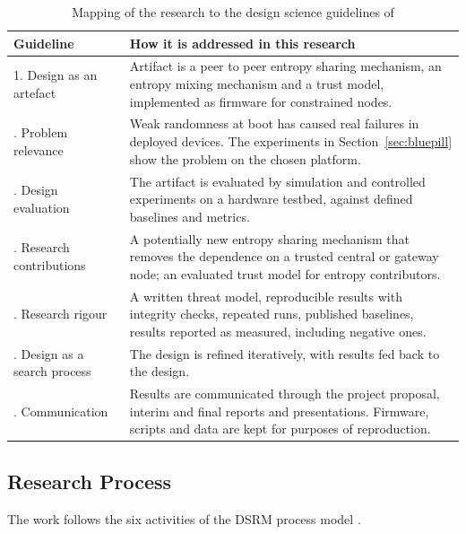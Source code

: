 \documentclass[a4paper, 12pt]{article}
\begin{document}
\begin{table}[htbp]
\centering
\small
\caption{Mapping of the research to the design science guidelines of \citet{hevner2004design}}
\label{tab:meth_hevner}
\begin{tabularx}{\textwidth}{@{}p{}X@{}}
\toprule
\textbf{Guideline} & \textbf{How it is addressed in this research} \\
\midrule
1. Design as an artefact & Artifact is a peer to peer entropy sharing mechanism, an entropy mixing mechanism and a trust model, implemented as firmware for constrained nodes. \\
\addlinespace
2. Problem relevance & Weak randomness at boot has caused real failures in deployed devices. The experiments in Section~\ref{sec:bluepill} show the problem on the chosen platform. \\
\addlinespace
3. Design evaluation & The artifact is evaluated by simulation and controlled experiments on a hardware testbed, against defined baselines and metrics.\\
\addlinespace
4. Research contributions & A potentially new entropy sharing mechanism that removes the dependence on a trusted central or gateway node; an evaluated trust model for entropy contributors.\\
\addlinespace
5. Research rigour & A written threat model, reproducible results with integrity checks, repeated runs, published baselines, results reported as measured, including negative ones. \\
\addlinespace
6. Design as a search process & The design is refined iteratively, with results fed back to the design.\\
\addlinespace
7. Communication & Results are communicated through the project proposal, interim and final reports and presentations. Firmware, scripts and data are kept for purposes of reproduction.\\
\bottomrule
\end{tabularx}
\end{table}
 
\subsection{Research Process}
 
The work follows the six activities of the DSRM process model \citep{peffers2007dsrm}.
 
\end{document}
